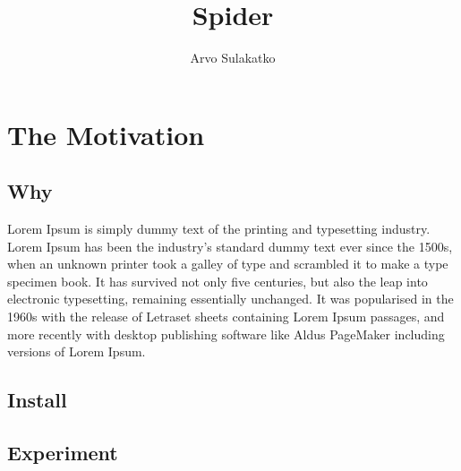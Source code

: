 \documentclass[12pt,leqno]{book}
\title{Spider}
\author{Arvo Sulakatko}
\begin{document}
\maketitle

\tableofcontents


\part{The Motivation}

\chapter{Why}

Lorem Ipsum is simply dummy text of the printing and typesetting industry.  Lorem Ipsum has been the industry's standard dummy text ever since the 1500s, when an unknown printer took a galley of type and scrambled it to make a type specimen book. It has survived not only five centuries, but also the leap into electronic typesetting, remaining essentially unchanged. It was popularised in the 1960s with the release of Letraset sheets containing Lorem Ipsum passages, and more recently with desktop publishing software like Aldus PageMaker including versions of Lorem Ipsum.

\chapter{Install}
\chapter{Experiment}
\end{document}
